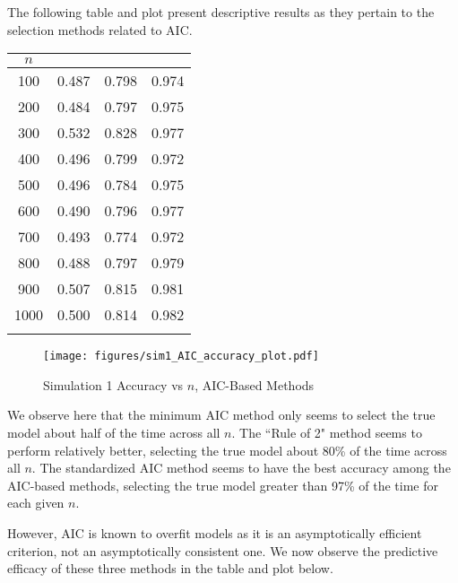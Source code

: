 		The following table and plot present descriptive results as they pertain to the selection methods related to AIC.
		\begin{table}[H]
			\centering
			\small\addtolength{\tabcolsep}{-3pt}
			\setlength\extrarowheight{-3pt}
			{
			\begin{tabular}{ c|c|c|c}
			$n$ & \vtop{\hbox{\strut Minimum AIC}\hbox{\strut Accuracy}} & \vtop{\hbox{\strut AIC Rule of 2}\hbox{\strut Accuracy}} & \vtop{\hbox{\strut Standardized AIC} \hbox{\strut Accuracy}} \\
			 \hline
			 100 & 0.487 & 0.798 & 0.974 \\
			 200 & 0.484 & 0.797 & 0.975 \\
			 300 & 0.532 & 0.828 & 0.977 \\
			 400 & 0.496 & 0.799 & 0.972 \\
			 500 & 0.496 & 0.784 & 0.975 \\
			 600 & 0.490 & 0.796 & 0.977 \\
			 700 & 0.493 & 0.774 & 0.972 \\
			 800 & 0.488 & 0.797 & 0.979 \\
			 900 & 0.507 & 0.815 & 0.981 \\
			 1000 & 0.500 & 0.814 & 0.982 \\
			 \Xhline{3\arrayrulewidth}
			\end{tabular}
			}
		\end{table}

		\begin{figure}[H]
			\centering
			\captionsetup{justification=centering}
			\texttt{[image: figures/sim1\_AIC\_accuracy\_plot.pdf]}
			\caption{\label{fig:sim1_aic_accuracy_plot} Simulation 1 Accuracy vs $n$, AIC-Based Methods}
		\end{figure}

		We observe here that the minimum AIC method only seems to select the true model about half of the time across all $n$. The ``Rule of 2" method seems to perform relatively better,
		selecting the true model about 80\% of the time across all $n$. The standardized AIC method seems to have the best accuracy among the AIC-based methods, selecting the true model
		greater than 97\% of the time for each given $n$.

		However, AIC is known to overfit models as it is an asymptotically efficient criterion, not an asymptotically consistent one. We now observe the predictive efficacy
		of these three methods in the table and plot below.

